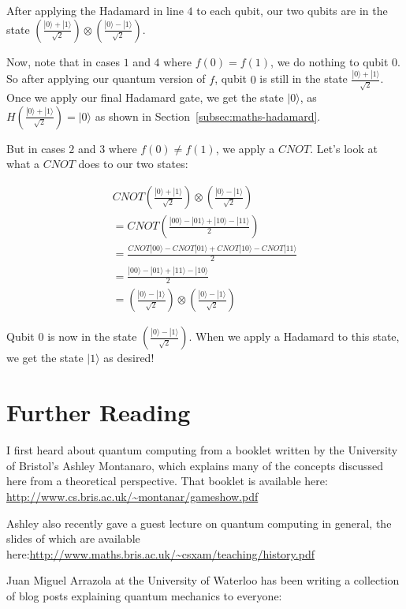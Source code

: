 \documentclass[twocolumn]{article}
\begin{document}
After applying the Hadamard in line $4$ to each qubit, our two qubits are in the state $\left(\frac{|0\rangle + |1\rangle}{\sqrt{2}}\right) \otimes \left(\frac{|0\rangle - |1\rangle}{\sqrt{2}}\right)$.

Now, note that in cases $1$ and $4$ where $f(0) = f(1)$, we do nothing to qubit $0$. So after applying our quantum version of $f$, qubit $0$ is still in the state $\frac{|0\rangle + |1\rangle}{\sqrt{2}}$. Once we apply our final Hadamard gate, we get the state $|0\rangle$, as $H(\frac{|0\rangle + |1\rangle}{\sqrt{2}}) = |0\rangle$ as shown in Section~\ref{subsec:maths-hadamard}.

But in cases $2$ and $3$ where $f(0) \neq f(1)$, we apply a $CNOT$. Let's look at what a $CNOT$ does to our two states:

\begin{gather*}
CNOT\left(\frac{|0\rangle + |1\rangle}{\sqrt{2}}\right) \otimes \left(\frac{|0\rangle - |1\rangle}{\sqrt{2}}\right)\\
= CNOT\left(\frac{|00\rangle - |01\rangle + |10\rangle - |11\rangle}{2}\right)\\
= \frac{CNOT|00\rangle - CNOT|01\rangle + CNOT|10\rangle - CNOT|11\rangle}{2}\\
= \frac{|00\rangle - |01\rangle + |11\rangle - |10\rangle}{2}\\
= \left(\frac{|0\rangle - |1\rangle}{\sqrt{2}}\right) \otimes \left(\frac{|0\rangle - |1\rangle}{\sqrt{2}}\right)
\end{gather*}

Qubit $0$ is now in the state $(\frac{|0\rangle - |1\rangle}{\sqrt{2}})$. When we apply a Hadamard to this state, we get the state $|1\rangle$ as desired!

\section{Further Reading}
\label{sec:further-reading}

I first heard about quantum computing from a booklet written by the University of Bristol's Ashley Montanaro, which explains many of the concepts discussed here from a theoretical perspective. That booklet is available here: \url{http://www.cs.bris.ac.uk/~montanar/gameshow.pdf}

Ashley also recently gave a guest lecture on quantum computing in general, the slides of which are available here:\url{http://www.maths.bris.ac.uk/~csxam/teaching/history.pdf}

Juan Miguel Arrazola at the University of Waterloo has been writing a collection of blog posts explaining quantum mechanics to everyone:
\end{document}
